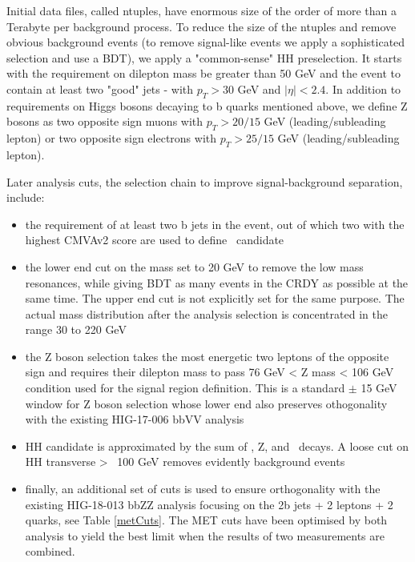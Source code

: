Initial data files, called ntuples, have enormous size of the order of more than a Terabyte per background process. To reduce the size of the ntuples and remove obvious background events (to remove signal-like events we apply a sophisticated selection and use a BDT), we apply a "common-sense" HH preselection. It starts with the requirement on dilepton mass 
 be greater than 50 GeV and the event to contain at least two "good" jets - with $p_{T} > 30$ GeV and $|\eta| < 2.4$. In addition to requirements on Higgs bosons decaying to b quarks mentioned above, we define Z bosons as two opposite sign muons with $p_{T} > 20/15$ GeV (leading/subleading lepton) or two opposite sign electrons with $p_{T} > 25/15$ GeV (leading/subleading lepton). 



Later analysis cuts, the selection chain to improve signal-background separation, include: 

 \begin{itemize}
 \item  the requirement of at least two b jets in the event, out of which two with the highest CMVAv2 score are used to define \HBB ~candidate
 \item  the lower end cut on the \HBB mass set to 20 GeV to remove the low mass resonances, while giving BDT as many events in the CRDY as possible at the same time. The upper end cut is not explicitly set for the same purpose. The actual \HBB mass distribution after the analysis selection is concentrated in the range 30 to 220 GeV
 \item  the Z boson selection takes the most energetic two leptons of the opposite sign and requires their dilepton mass to pass 76 GeV < Z mass < 106 GeV condition used for the signal region definition. This is a standard $\pm$ 15 GeV window for Z boson selection whose lower end also preserves othogonality with the existing HIG-17-006 bbVV analysis
 \item  HH candidate is approximated by the sum of \ETslash, Z, and \HBB~decays. A loose cut on HH transverse \textgreater~ 100 GeV removes evidently background events
 \item  finally, an additional set of \ETslash cuts is used to ensure orthogonality with the existing HIG-18-013 bbZZ analysis focusing on the 2b jets + 2 leptons + 2 quarks, see Table \ref{metCuts}. The MET cuts have been optimised by both analysis to yield the best limit when the results of two measurements are combined. 
 \end{itemize}


